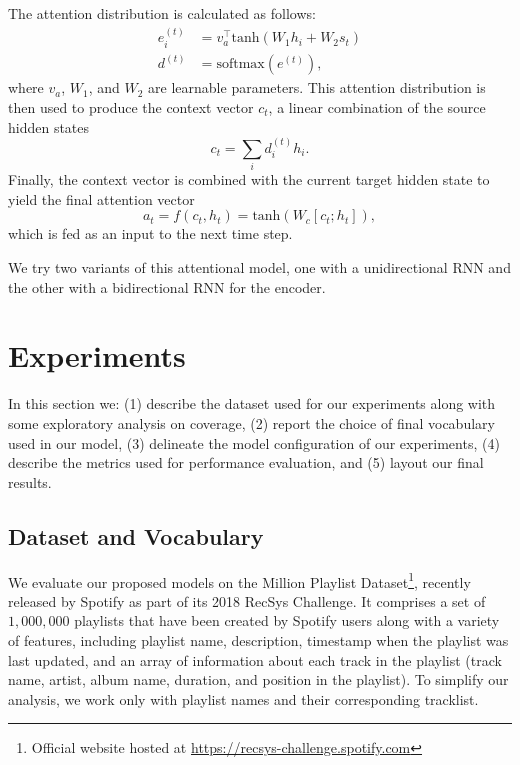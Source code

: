 \documentclass{article} %
\begin{document}
The attention distribution is calculated as follows:
\begin{align*}
    e_i^{(t)} &= v_a^\top\mbox{tanh}(W_1h_i + W_2s_t) \\
    d^{(t)} &= \mbox{softmax}(e^{(t)}),
\end{align*}
where $v_a$, $W_1$, and $W_2$ are learnable parameters. 
This attention distribution is then used to produce the context vector $c_t$, a linear combination of the source hidden states
\[
c_t = \sum_{i}d_i^{(t)}h_i.
\]
Finally, the context vector is combined with the current target hidden state to yield the final attention vector
\[
a_t = f(c_t, h_t) = \mbox{tanh}(W_c[c_t; h_t]),
\] 
which is fed as an input to the next time step.

We try two variants of this attentional model, one with a unidirectional RNN and the other with a bidirectional RNN for the encoder.

\section{Experiments}
\label{sec:exp}
In this section we: (1) describe the dataset used for our experiments along with some exploratory analysis on coverage, (2) report the choice of final vocabulary used in our model, (3) delineate the model configuration of our experiments, (4) describe the metrics used for performance evaluation, and (5) layout our final results. 

\subsection{Dataset and Vocabulary}
\label{sec:data}

We evaluate our proposed models on the Million Playlist Dataset\footnote{Official website hosted at \href{https://recsys-challenge.spotify.com}{https://recsys-challenge.spotify.com}}, recently released by Spotify as part of its 2018 RecSys Challenge.
It comprises a set of $1,000,000$ playlists that have been created by Spotify users along with a variety of features, including playlist name, description, timestamp when the playlist was last updated, and an array of information about each track in the playlist (track name, artist, album name, duration, and position in the playlist).
To simplify our analysis, we work only with playlist names and their corresponding tracklist. 
\end{document}
